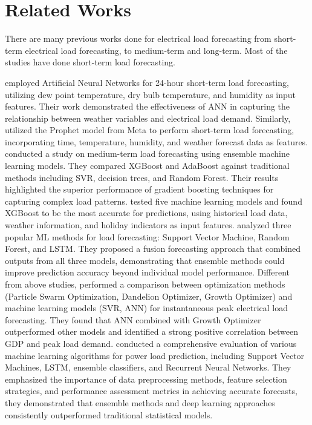 \documentclass[oneside, 12pt]{book}
\numberwithin{equation}{chapter}
\newcommand{\sizexii}{\fontsize{12pt}{6pt}\selectfont}
\begin{document}
\section{\sizexii Related Works}
There are many previous works done for electrical load forecasting from short-term
electrical load forecasting, to medium-term and long-term. Most of the studies have
done short-term load forecasting.

\parencite{singla2019electrical} employed Artificial Neural Networks for 24-hour short-term load forecasting, utilizing dew point temperature, dry bulb temperature, and humidity as input features. Their work demonstrated the effectiveness of ANN in capturing the relationship between weather variables and electrical load demand. Similarly, \parencite{desai2021electrical} utilized the Prophet model from Meta to perform short-term load forecasting, incorporating time, temperature, humidity, and weather forecast data as features. \parencite{matrenin2022medium} conducted a study on medium-term load forecasting using ensemble  machine learning models. They compared XGBoost and AdaBoost against traditional methods including SVR, decision trees, and Random Forest. Their results highlighted the superior performance of gradient boosting techniques for capturing complex load patterns. \parencite{aguilar2021short} tested five machine learning models and found XGBoost to be the most accurate for predictions, using historical load data, weather information, and holiday indicators as input features. \parencite{guo2021machine} analyzed three popular ML methods for load forecasting: Support Vector Machine, Random Forest, and LSTM. They proposed a fusion forecasting approach that combined outputs from all three models, demonstrating that ensemble methods could improve prediction accuracy beyond individual model performance. 
Different from above studies, \parencite{saglam2024instantaneous} performed a comparison between optimization methods (Particle Swarm Optimization, Dandelion Optimizer, Growth Optimizer) and machine learning models (SVR, ANN) for instantaneous peak electrical load forecasting. They found that ANN combined with Growth Optimizer outperformed other models and identified a strong positive correlation between GDP and peak load demand. \parencite{jain2024comparative} conducted a comprehensive evaluation of various machine learning algorithms for power load prediction, including Support Vector Machines, LSTM, ensemble classifiers, and Recurrent Neural Networks. They emphasized the importance of data preprocessing methods, feature selection strategies, and performance assessment metrics in achieving accurate forecasts, they demonstrated that ensemble methods and deep learning approaches consistently outperformed traditional
statistical models.
\end{document}
